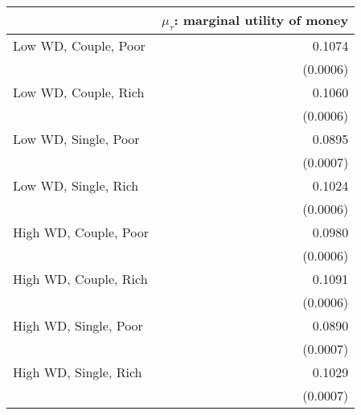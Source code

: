\begin{tabular}{lr} 
\toprule 
                                & $\mu_\tau$: marginal utility of money  \\ 
\midrule 
          Low WD, Couple, Poor  &       0.1074  \\ 
                                & (0.0006)  \\ 
          Low WD, Couple, Rich  &       0.1060  \\ 
                                & (0.0006)  \\ 
          Low WD, Single, Poor  &       0.0895  \\ 
                                & (0.0007)  \\ 
          Low WD, Single, Rich  &       0.1024  \\ 
                                & (0.0006)  \\ 
         High WD, Couple, Poor  &       0.0980  \\ 
                                & (0.0006)  \\ 
         High WD, Couple, Rich  &       0.1091  \\ 
                                & (0.0006)  \\ 
         High WD, Single, Poor  &       0.0890  \\ 
                                & (0.0007)  \\ 
         High WD, Single, Rich  &       0.1029  \\ 
                                & (0.0007)  \\ 
\bottomrule \end{tabular} 
